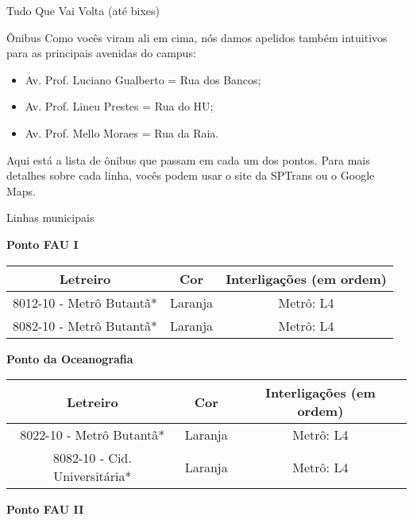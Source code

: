 \begin{secao}{Tudo Que Vai Volta (até bixes)}
\begin{subsecao}{Ônibus}
Como vocês viram ali em cima, nós damos apelidos também intuitivos para as
principais avenidas do campus:
\begin{itemize}
	\item Av. Prof. Luciano Gualberto = Rua dos Bancos;
	\item Av. Prof. Lineu Prestes = Rua do HU;
	\item Av. Prof. Mello Moraes = Rua da Raia.
\end{itemize}

Aqui está a lista de ônibus que passam em cada um dos pontos. Para mais detalhes
sobre cada linha, vocês podem usar o site da SPTrans ou o Google Maps.

\begin{subsubsecao}{Linhas municipais}

{\bf Ponto FAU I}

\begin{center}
	\begin{tabular}{|c|c|c|}
      \hline
	  Letreiro & Cor & Interligações (em ordem)\\
	  \hline
	  8012-10 - Metrô Butantã* & Laranja & Metrô: L4\\
   	8082-10 - Metrô Butantã* & Laranja & Metrô: L4\\
      \hline
	\end{tabular}
\end{center}

{\bf Ponto da Oceanografia}

\begin{center}
	\begin{tabular}{|c|c|c|}
      \hline
	  Letreiro & Cor & Interligações (em ordem)\\
	  \hline
	  8022-10 - Metrô Butantã* & Laranja & Metrô: L4\\
   	  8082-10 - Cid. Universitária* & Laranja & Metrô: L4\\
      \hline
	\end{tabular}
\end{center}

{\bf Ponto FAU II}


\end{subsubsecao}
\end{subsecao}
\end{secao}
